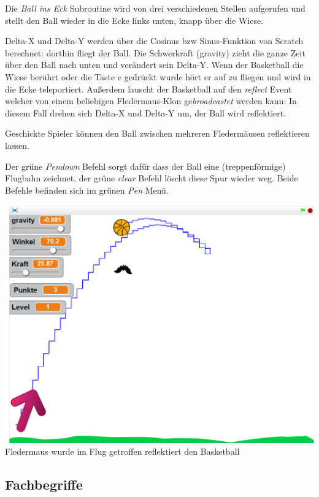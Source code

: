 Die \textit{Ball ins Eck} Subroutine wird von drei verschiedenen Stellen aufgerufen und stellt den Ball wieder in die Ecke links unten, knapp über die Wiese.

Delta-X und Delta-Y werden über die Cosinus bzw Sinus-Funktion von Scratch berechnet: dorthin fliegt der Ball. Die Schwerkraft (gravity) zieht die ganze Zeit über den Ball nach unten und verändert sein Delta-Y. Wenn der Basketball die Wiese berührt oder die Taste e gedrückt wurde hört er auf zu fliegen und wird in die Ecke teleportiert. Außerdem lauscht der Basketball auf den \textit{reflect} Event welcher von einem beliebigen Fledermaus-Klon ge\textit{broadcastet} werden kann: In diesem Fall drehen sich Delta-X und Delta-Y um, der Ball wird reflektiert. 

Geschickte Spieler können den Ball zwischen mehreren Fledermäusen reflektieren lassen. 

Der grüne \textit{Pendown} Befehl sorgt dafür dass der Ball eine (treppenförmige) Flugbahn zeichnet, der grüne \textit{clear} Befehl löscht diese Spur wieder weg. Beide Befehle befinden sich im grünen \textit{Pen} Menü.

\begin{center}
\includegraphics[width=\linewidth]{scratch/final.png}
\footnotesize{Fledermaus wurde im Flug getroffen reflektiert den Basketball}
\end{center}


\subsection*{Fachbegriffe}

